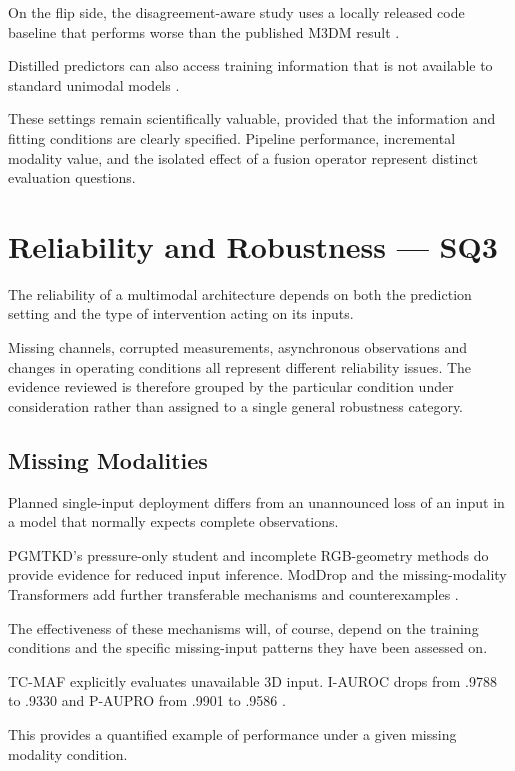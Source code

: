 On the flip side, the disagreement-aware study uses a locally released code baseline that performs
worse than the published M3DM result \citep[PDF p.~10, Table~4]{P033}.

Distilled predictors can also access training information that is not available to standard unimodal
models \citep{Li2025PGMTKD}.

These settings remain scientifically valuable, provided that the information and fitting conditions
are clearly specified. Pipeline performance, incremental modality value, and the isolated effect of
a fusion operator represent distinct evaluation questions.

\section{Reliability and Robustness --- SQ3}

The reliability of a multimodal architecture depends on both the prediction setting and the type of
intervention acting on its inputs.

Missing channels, corrupted measurements, asynchronous observations and changes in operating
conditions all represent different reliability issues. The evidence reviewed is therefore grouped by
the particular condition under consideration rather than assigned to a single general robustness
category.

\subsection{Missing Modalities}

Planned single-input deployment differs from an unannounced loss of an input in a model that
normally expects complete observations.

PGMTKD's pressure-only student and incomplete RGB-geometry methods do provide evidence for reduced
input inference. ModDrop and the missing-modality Transformers add further transferable mechanisms
and counterexamples \citep{Li2025PGMTKD,Sui2026Incomplete,P005,P016}.

The effectiveness of these mechanisms will, of course, depend on the training conditions and the
specific missing-input patterns they have been assessed on.

TC-MAF explicitly evaluates unavailable 3D input. I-AUROC drops from .9788 to .9330 and P-AUPRO from
.9901 to .9586 \citep[PDF p.~7, Table~3]{P026}.

This provides a quantified example of performance under a given missing modality condition.

